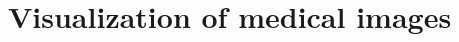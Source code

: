 \documentclass{report}
\begin{document}
\part{Visualization of medical images}




\begin{comment}
\part{Processing of medical images}




\end{comment}

%

\printglossary[type=\acronymtype]



\end{document}

